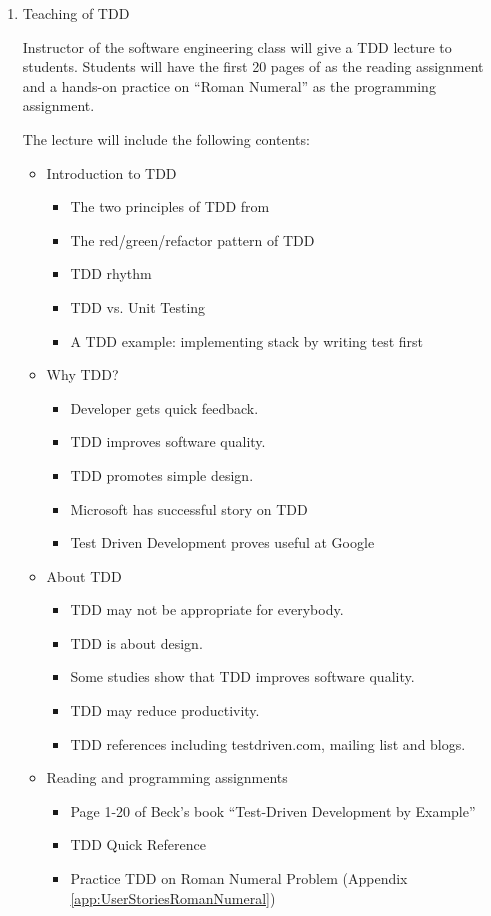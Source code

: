 \begin{enumerate}
\item{Teaching of TDD}

Instructor of the software engineering class will give a TDD lecture
to students. Students will have the first 20 pages of \cite{Beck:03}
as the reading assignment and a hands-on practice on ``Roman Numeral'' as the
programming assignment.

The lecture will include the following contents:
\begin{itemize}
\item Introduction to TDD
  \begin{itemize}
  \item The two principles of TDD from \cite{Beck:03}
  \item The red/green/refactor pattern of TDD
  \item TDD rhythm \cite{TDDRhythm}
  \item TDD vs. Unit Testing
  \item A TDD example: implementing stack by writing test first 
  \end{itemize}
\item Why TDD?
  \begin{itemize}
    \item{Developer gets quick feedback.}
    \item{TDD improves software quality.}
    \item{TDD promotes simple design.}
    \item{Microsoft has successful story on TDD \cite{Bhat:06}}
    \item{Test Driven Development proves useful at Google\cite{RoyOsheroveBlog}}
  \end{itemize}
\item About TDD
  \begin{itemize}
    \item{TDD may not be appropriate for everybody.}
    \item{TDD is about design.}
    \item{Some studies show that TDD improves software quality.}
    \item{TDD may reduce productivity.}
    \item{TDD references including testdriven.com, mailing list and blogs.}
  \end{itemize}
\item Reading and programming assignments
  \begin{itemize}
    \item {Page 1-20 of Beck's book ``Test-Driven Development by Example'' \cite{Beck:03}}
    \item {TDD Quick Reference \cite{TDDQuickReference}}
    \item {Practice TDD on Roman Numeral Problem (Appendix
    \ref{app:UserStoriesRomanNumeral})}
  \end{itemize}
\end{itemize}


\end{enumerate}
